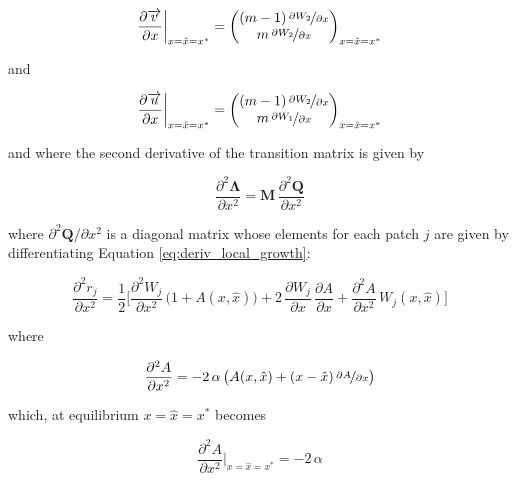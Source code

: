 \begin{equation}
    \frac{\partial \overrightarrow{v}}{\partial x}\bigg|_{x=\hat x=x^*} = 
    \begin{pmatrix}
        (m-1)\,\nicefrac{\partial W_2}{\partial x}\\
        m\,\nicefrac{\partial W_2}{\partial x}
    \end{pmatrix}
    _{x=\hat x=x^*}
\end{equation}

and

\begin{equation}
    \frac{\partial \overrightarrow{u}}{\partial x}\bigg|_{x=\hat x=x^*} = 
    \begin{pmatrix}
        (m-1)\,\nicefrac{\partial W_2}{\partial x}\\
        m\,\nicefrac{\partial W_1}{\partial x}
    \end{pmatrix}
    _{x=\hat x=x^*}
    \label{eq:right_eigenvector_equilibrium}
\end{equation}

and where the second derivative of the transition matrix is given by 

\begin{equation}
    \frac{\partial^2 \pmb{\Lambda}}{\partial x^2} = \pmb{M} \, \frac{\partial^2 \pmb{Q}}{\partial x^2}
    \label{eq:second_derivative_transition}
\end{equation}

where $\partial^2 \pmb{Q} / \partial x^2$ is a diagonal matrix whose elements for each patch $j$ are given by differentiating Equation \ref{eq:deriv_local_growth}:

\begin{equation}
    \frac{\partial^2 r_j}{\partial x^2} = \frac{1}{2} \bigg[\frac{\partial^2 W_j}{\partial x^2}\,\big(1+A(x,\hat{x})\big) + 2\,\frac{\partial W_j}{\partial x}\,\frac{\partial A}{\partial x} + \frac{\partial^2 A}{\partial x^2}\,W_j(x,\hat{x})\bigg]
\end{equation}

where

\begin{equation}
    \frac{\partial^2 A}{\partial x^2} = -2\,\alpha\,\big( A(x,\hat{x}) + (x-\hat{x})\,\nicefrac{\partial A}{\partial x} \big)
\end{equation}

which, at equilibrium $x=\hat{x}=x^*$ becomes

\begin{equation}
    \frac{\partial^2 A}{\partial x^2}\bigg|_{x=\hat{x}=x^*} = -2\,\alpha
\end{equation}


